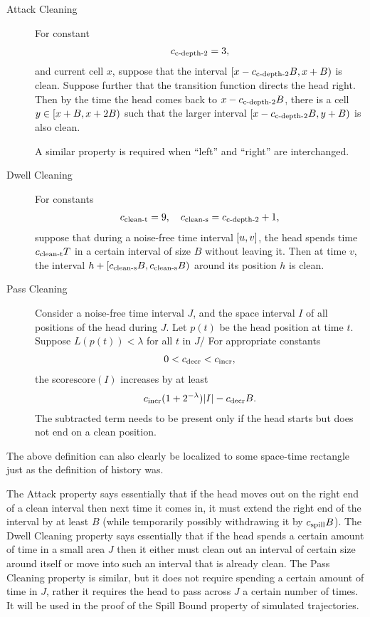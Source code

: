 \documentclass[12pt]{memoir}
\def\B{B}
\newcommand{\Tu}{T}
\newcommand{\score}{\mathrm{score}}
\newcommand{\cns}[1]{c_{\textrm{\upshape #1}}}
\newcommand{\cDecr}{\cns{decr}}
\newcommand{\cCleanS}{\cns{clean-s}}
\newcommand{\cCleanT}{\cns{clean-t}}
\newcommand{\cCDepth}[1]{\cns{c-depth-#1}}
\newcommand{\cIncr}{\cns{incr}}
\newcommand{\cSpill}{\cns{spill}}
\begin{document}
\begin{definition}[Trajectory]
\begin{description}
\item[Attack Cleaning] \label{i:def.traj.attack-from-outside}
For constant
\begin{align}\label{eq:cns.clean-depth-2}
   \cCDepth2 =3,
 \end{align}
and current cell \( x \), suppose that the interval
\( \lint{x-\cCDepth2\B}{x+\B} \) is clean.
Suppose further that the transition function directs the head right.
Then by the time the head comes back to \( x-\cCDepth2 \B \), there is a cell
\( y\in \lint{x+\B}{x+2\B} \) such that the larger interval 
\( \lint{x-\cCDepth2\B}{y+\B} \) is also clean.

A similar property is required when ``left'' and ``right'' are interchanged.

\item[Dwell Cleaning] \label{i:def.traj.dwell-cleaning}
For constants
\begin{align}\label{eq:cns.clean}
        \cCleanT =9,
\quad   \cCleanS =\cCDepth2 +1,
 \end{align}
suppose that during a noise-free time interval \( [u,v] \), 
the head spends time \( \cCleanT \Tu \)  in a certain interval of size \( \B \)
without leaving it.
Then at time \( v \), the interval 
\( h+\lint{\cCleanS \B}{\cCleanS\B}  \) around its position \( h \) is clean.

\item[Pass Cleaning]\label{i:def.traj.pass-cleaning}
Consider a noise-free time interval \( J \), and the space interval \( I \)
of all positions of the head during \( J \).
Let \( p(t) \) be the head position at time \( t \).
Suppose \( L(p(t))<\lambda \) for all \( t \) in \( J \)/
For appropriate constants 
\begin{align*}
   0<\cDecr<\cIncr,
 \end{align*}
the score\( \score(I) \) increases by at least 
\begin{align*}
 \cIncr(1+2^{-\lambda})|I|-\cDecr\B .
 \end{align*}
The subtracted term needs to be present only if the head starts but does not end
on a clean position.
\end{description}

\end{definition}

The above definition can also clearly be localized to some space-time
rectangle just as the definition of history was.

The Attack property says essentially that if the head moves out on the right end
of a clean interval then next time it comes in, it must extend the right end of the interval 
by at least \( \B \) (while temporarily possibly withdrawing it by \( \cSpill\B \)).
The Dwell Cleaning property says essentially 
that if the head spends a certain amount of time in a small area \( J \)
then it either must clean out an interval of certain size around itself or move into
such an interval that is already clean.
The Pass Cleaning property is similar, but it does not require spending a certain amount of
time in \( J \), rather it requires the head to pass across \( J \) a certain number of times.
It will be used in the proof of the Spill Bound property of simulated trajectories.
\end{document}
